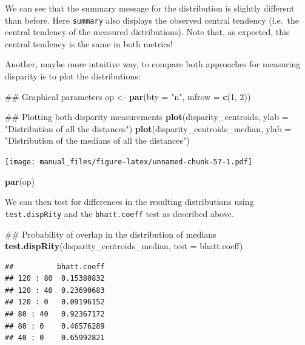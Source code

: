 \documentclass[]{book}
\newenvironment{Shaded}{\begin{snugshade}}{\end{snugshade}}
\newcommand{\KeywordTok}[1]{\textcolor[rgb]{0.13,0.29,0.53}{\textbf{#1}}}
\newcommand{\DataTypeTok}[1]{\textcolor[rgb]{0.13,0.29,0.53}{#1}}
\newcommand{\DecValTok}[1]{\textcolor[rgb]{0.00,0.00,0.81}{#1}}
\newcommand{\StringTok}[1]{\textcolor[rgb]{0.31,0.60,0.02}{#1}}
\newcommand{\NormalTok}[1]{#1}
\theoremstyle{definition}
\theoremstyle{definition}
\theoremstyle{remark}
\begin{document}
We can see that the summary message for the distribution is slightly
different than before. Here \texttt{summary} also displays the observed
central tendency (i.e.~the central tendency of the measured
distributions). Note that, as expected, this central tendency is the
same in both metrics!

Another, maybe more intuitive way, to compare both approaches for
measuring disparity is to plot the distributions:

\begin{Shaded}
\begin{Highlighting}[]
\NormalTok{## Graphical parameters}
\NormalTok{op <-}\StringTok{ }\KeywordTok{par}\NormalTok{(}\DataTypeTok{bty =} \StringTok{"n"}\NormalTok{, }\DataTypeTok{mfrow =} \KeywordTok{c}\NormalTok{(}\DecValTok{1}\NormalTok{, }\DecValTok{2}\NormalTok{))}

\NormalTok{## Plotting both disparity measurements}
\KeywordTok{plot}\NormalTok{(disparity_centroids, }\DataTypeTok{ylab =} \StringTok{"Distribution of all the distances"}\NormalTok{)}
\KeywordTok{plot}\NormalTok{(disparity_centroids_median,}
     \DataTypeTok{ylab =} \StringTok{"Distribution of the medians of all the distances"}\NormalTok{)}
\end{Highlighting}
\end{Shaded}

\texttt{[image: manual\_files/figure-latex/unnamed-chunk-57-1.pdf]}

\begin{Shaded}
\begin{Highlighting}[]
\KeywordTok{par}\NormalTok{(op)}
\end{Highlighting}
\end{Shaded}

We can then test for differences in the resulting distributions using
\texttt{test.dispRity} and the \texttt{bhatt.coeff} test as described
above.

\begin{Shaded}
\begin{Highlighting}[]
\NormalTok{## Probability of overlap in the distribution of medians}
\KeywordTok{test.dispRity}\NormalTok{(disparity_centroids_median, }\DataTypeTok{test =}\NormalTok{ bhatt.coeff)}
\end{Highlighting}
\end{Shaded}

\begin{verbatim}
##          bhatt.coeff
## 120 : 80  0.15380832
## 120 : 40  0.23690683
## 120 : 0   0.09196152
## 80 : 40   0.92367172
## 80 : 0    0.46576289
## 40 : 0    0.65992821
\end{verbatim}
\end{document}
